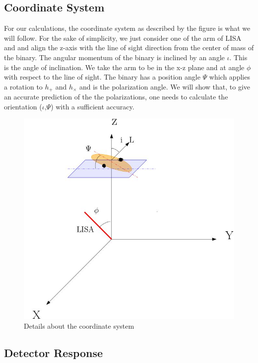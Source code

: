 \documentclass[12pt,a4paper,oneside]{book}
\begin{document}
\subsection*{Coordinate System}

For our calculations, the coordinate system as described by the figure is what we will follow. For the sake of simplicity, we just consider one of the arm of LISA and and align the z-axis with the line of sight direction from the center of mass of the binary. The angular momentum of the binary is inclined by an angle $\iota$. This is the angle of inclination. We take the arm to be in the x-z plane and at angle $\phi$ with respect to the line of sight. The binary has a position angle $\Psi$ which applies a rotation to $h_{+}$ and $h_{×}$ and is the polarization angle. We will show that, to give an accurate prediction of the the polarizations, one needs to calculate the orientation ($\iota$,$\Psi$) with a sufficient accuracy.

\begin{figure}[!htb]
\centering
\includegraphics[scale=0.5]{../LISA_orientation1.jpg} 
\caption{Details about the coordinate system}
\end{figure}

\subsection*{Detector Response}
\end{document}
